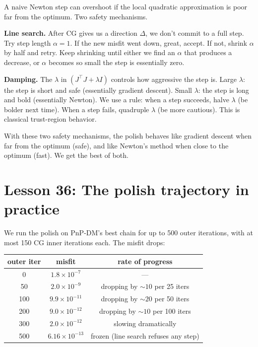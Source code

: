 \documentclass[11pt]{article}
\begin{document}
A naive Newton step can overshoot if the local quadratic approximation
is poor far from the optimum. Two safety mechanisms.

\textbf{Line search.} After CG gives us a direction $\Delta$, we don't
commit to a full step. Try step length $\alpha = 1$. If the new misfit
went down, great, accept. If not, shrink $\alpha$ by half and retry.
Keep shrinking until either we find an $\alpha$ that produces a
decrease, or $\alpha$ becomes so small the step is essentially zero.

\textbf{Damping.} The $\lambda$ in $(J^\top J + \lambda I)$ controls how
aggressive the step is. Large $\lambda$: the step is short and safe
(essentially gradient descent). Small $\lambda$: the step is long and
bold (essentially Newton). We use a rule: when a step succeeds, halve
$\lambda$ (be bolder next time). When a step fails, quadruple $\lambda$
(be more cautious). This is classical trust-region behavior.

With these two safety mechanisms, the polish behaves like gradient
descent when far from the optimum (safe), and like Newton's method
when close to the optimum (fast). We get the best of both.

\section{Lesson 36: The polish trajectory in practice}

We run the polish on PnP-DM's best chain for up to 500 outer iterations,
with at most 150 CG inner iterations each. The misfit drops:

\begin{center}
\begin{tabular}{ccc}
\toprule
outer iter & misfit & rate of progress \\
\midrule
0 & $1.8 \times 10^{-7}$ & --- \\
50 & $2.0 \times 10^{-9}$ & dropping by $\sim 10$ per 25 iters \\
100 & $9.9 \times 10^{-11}$ & dropping by $\sim 20$ per 50 iters \\
200 & $9.0 \times 10^{-12}$ & dropping by $\sim 10$ per 100 iters \\
300 & $2.0 \times 10^{-12}$ & slowing dramatically \\
500 & $6.16 \times 10^{-13}$ & frozen (line search refuses any step) \\
\bottomrule
\end{tabular}
\end{center}
\end{document}
